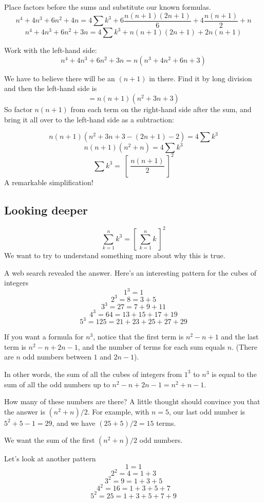 \documentclass[11pt, oneside]{article}
\begin{document}
Place factors before the sums and substitute our known formulas.
\[ n^4 + 4n^3 + 6n^2 + 4n = 4 \sum k^3 + 6 \frac{n(n+1)(2n+1)}{6} + 4 \frac{n(n+1)}{2} + n \]
\[ n^4 + 4n^3 + 6n^2 + 3n = 4 \sum k^3 + n(n+1)(2n+1) + 2 n(n+1)  \]

Work with the left-hand side:
\[ n^4 + 4n^3 + 6n^2 + 3n = n(n^3 + 4n^2 + 6n + 3) \]

We have to believe there will be an $(n + 1)$ in there.  Find it by long division and then the left-hand side is
\[ = n(n+1)(n^2 + 3n + 3) \]
So factor $n(n+1)$ from each term on the right-hand side after the sum, and bring it all over to the left-hand side as a subtraction:

\[ n(n+1)(n^2 + 3n + 3 - (2n + 1) - 2) = 4 \sum k^3 \]
\[ n(n+1)(n^2 + n) = 4 \sum k^3 \]
\[ \sum k^3 = \ [ \ \frac{n(n+1)}{2} \ ]^2 \] 
A remarkable simplification! 

\subsection*{Looking deeper}

\[ \sum\limits_{k=1}^n k^3 = [\ \sum\limits_{k=1}^n k \ ] ^2 \]
We want to try to understand something more about why this is true.  

A web search revealed the answer.  Here's an interesting pattern for the cubes of integers
\[ 1^3 = 1 \]
\[ 2^3 = 8 = 3 + 5 \]
\[ 3^3 = 27 = 7 + 9 + 11 \]
\[ 4^3 = 64 = 13 + 15 + 17 + 19 \]
\[ 5^3 = 125 = 21 + 23 + 25 + 27 + 29  \]

If you want a formula for $n^3$, notice that the first term is $n^2 - n + 1$ and the last term is $n^2 - n + 2n - 1$, and the number of terms for each sum equals $n$.  (There are $n$ odd numbers between $1$ and $2n-1$).

In other words, the sum of all the cubes of integers from $1^3$ to $n^3$ is equal to the sum of all the odd numbers up to $n^2 - n + 2n - 1 = n^2 + n - 1$.

How many of these numbers are there?  A little thought should convince you that the answer is $(n^2 + n)/2$.  For example, with $n=5$, our last odd number is $5^2 + 5 - 1 = 29$, and we have $(25 + 5)/2 = 15$ terms.

We want the sum of the first $(n^2 + n)/2$ odd numbers.

Let's look at another pattern
\[ 1 = 1 \]
\[ 2^2 = 4 = 1 + 3 \]
\[ 3^2 = 9 = 1 + 3 + 5 \]
\[ 4^2 = 16 = 1 + 3 + 5 + 7 \]
\[ 5^2 = 25 = 1 + 3 + 5 + 7 + 9 \]
\end{document}
